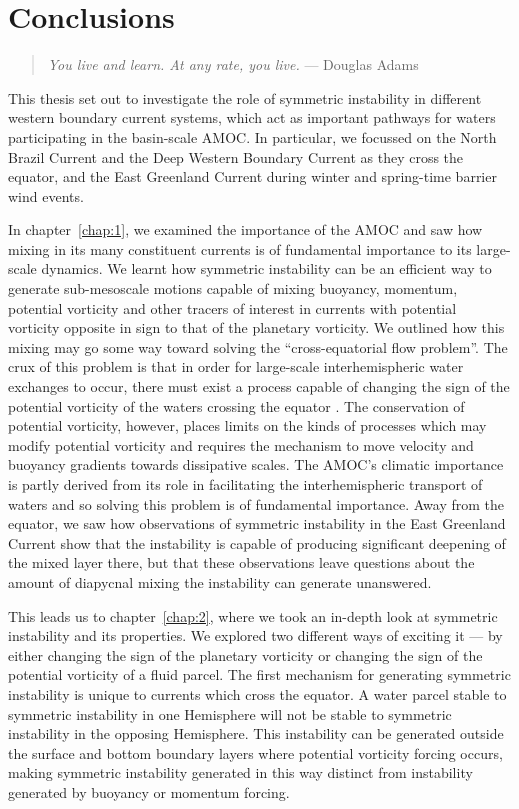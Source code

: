 \chapter{Conclusions}
\begin{quote}
    \textit{You live and learn. At any rate, you live.} --- Douglas Adams
\end{quote}
This thesis set out to investigate the role of symmetric instability in different western boundary current systems, which act as important pathways for waters participating in the basin-scale AMOC. In particular, we focussed on the North Brazil Current and the Deep Western Boundary Current as they cross the equator, and the East Greenland Current during winter and spring-time barrier wind events.

In chapter~\ref{chap:1}, we examined the importance of the AMOC and saw how mixing in its many constituent currents is of fundamental importance to its large-scale dynamics. We learnt how symmetric instability can be an efficient way to generate sub-mesoscale motions capable of mixing buoyancy, momentum, potential vorticity and other tracers of interest in currents with potential vorticity opposite in sign to that of the planetary vorticity. We outlined how this mixing may go some way toward solving the ``cross-equatorial flow problem''. The crux of this problem is that in order for large-scale interhemispheric water exchanges to occur, there must exist a process capable of changing the sign of the potential vorticity of the waters crossing the equator \citet{Killworth1991}. The conservation of potential vorticity, however, places limits on the kinds of processes which may modify potential vorticity and requires the mechanism to move velocity and buoyancy gradients towards dissipative scales. The AMOC's climatic importance is partly derived from its role in facilitating the interhemispheric transport of waters and so solving this problem is of fundamental importance. Away from the equator, we saw how observations of symmetric instability in the East Greenland Current show that the instability is capable of producing significant deepening of the mixed layer there, but that these observations leave questions about the amount of diapycnal mixing the instability can generate unanswered.

This leads us to chapter~\ref{chap:2}, where we took an in-depth look at symmetric instability and its properties. We explored two different ways of exciting it --- by either changing the sign of the planetary vorticity or changing the sign of the potential vorticity of a fluid parcel. The first mechanism for generating symmetric instability is unique to currents which cross the equator. A water parcel stable to symmetric instability in one Hemisphere will not be stable to symmetric instability in the opposing Hemisphere. This instability can be generated outside the surface and bottom boundary layers where potential vorticity forcing occurs, making symmetric instability generated in this way distinct from instability generated by buoyancy or momentum forcing.

